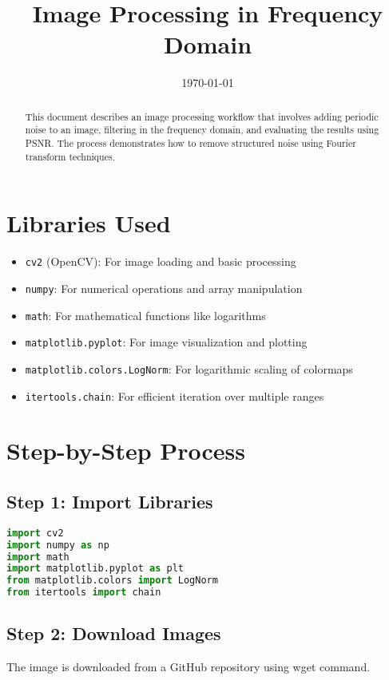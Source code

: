 \documentclass[12pt]{article}
\title{Image Processing in Frequency Domain}
\date{\today}
\begin{document}
\maketitle

\begin{abstract}
This document describes an image processing workflow that involves adding periodic noise to an image, filtering in the frequency domain, and evaluating the results using PSNR. The process demonstrates how to remove structured noise using Fourier transform techniques.
\end{abstract}

\section{Libraries Used}
\begin{itemize}
    \item \texttt{cv2} (OpenCV): For image loading and basic processing
    \item \texttt{numpy}: For numerical operations and array manipulation
    \item \texttt{math}: For mathematical functions like logarithms
    \item \texttt{matplotlib.pyplot}: For image visualization and plotting
    \item \texttt{matplotlib.colors.LogNorm}: For logarithmic scaling of colormaps
    \item \texttt{itertools.chain}: For efficient iteration over multiple ranges
\end{itemize}

\section{Step-by-Step Process}

\subsection{Step 1: Import Libraries}
\begin{lstlisting}[language=Python]
import cv2
import numpy as np
import math
import matplotlib.pyplot as plt
from matplotlib.colors import LogNorm
from itertools import chain
\end{lstlisting}

\subsection{Step 2: Download Images}
The image is downloaded from a GitHub repository using wget command.
\end{document}
